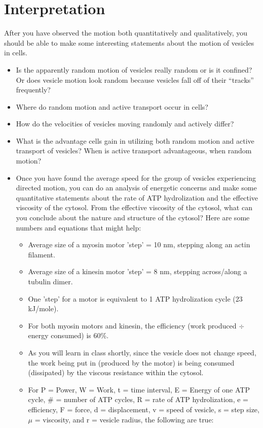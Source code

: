 \section*{Interpretation}
After you have observed the motion both quantitatively and qualitatively, you should be able to make some interesting statements about the motion of vesicles in cells.
\begin{itemize}
\item Is the apparently random motion of vesicles really random or is it confined? Or does vesicle motion look random because vesicles fall off of their “tracks” frequently?
\item Where do random motion and active transport occur in cells?
\item How do the velocities of vesicles moving randomly and actively differ?
\item What is the advantage cells gain in utilizing both random motion and active transport of vesicles? When is active transport advantageous, when random motion?
\item Once you have found the average speed for the group of vesicles experiencing directed motion, you can do an analysis of energetic concerns and make some quantitative statements about the rate of ATP hydrolization and the effective viscosity of the cytosol. From the effective viscosity of the cytosol, what can you conclude about the nature and structure of the cytosol? Here are some numbers and equations that might help:
\begin{itemize}
\item Average size of a myosin motor 'step' = 10 nm, stepping along an actin filament.
\item Average size of a kinesin motor 'step' = 8 nm, stepping across/along a tubulin dimer.
\item One 'step' for a motor is equivalent to 1 ATP hydrolization cycle (23 kJ/mole).
\item For both myosin motors and kinesin, the efficiency (work produced $\div$ energy consumed) is 60\%.
\item As you will learn in class shortly, since the vesicle does not change speed, the work being put in (produced by the motor) is being consumed (dissipated) by the viscous resistance within the cytosol.
\item For P = Power, W = Work, t = time interval, E = Energy of one ATP cycle, \# = number of ATP cycles, R = rate of ATP hydrolization, e = efficiency, F = force, d = displacement, v = speed of vesicle, s = step size, $\mu$ = viscosity, and r = vesicle radius, the following are true:

\end{itemize}
\end{itemize}
